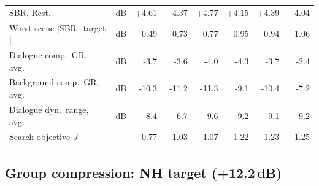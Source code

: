 \documentclass[11pt]{article}
\begin{document}
\begin{table}[H]
\begin{tabular}{@{}l l rrrrrr@{}}
SBR, Rest. & dB & +4.61 & +4.37 & +4.77 & +4.15 & +4.39 & +4.04 \\
Worst-scene $|$SBR$-$target$|$ & dB & 0.49 & 0.73 & 0.77 & 0.95 & 0.94 & 1.06 \\
Dialogue comp.\ GR, avg.\ & dB & -3.7 & -3.6 & -4.0 & -4.3 & -3.7 & -2.4 \\
Background comp.\ GR, avg.\ & dB & -10.3 & -11.2 & -11.3 & -9.1 & -10.4 & -7.2 \\
Dialogue dyn.\ range, avg.\ & dB & 8.4 & 6.7 & 9.6 & 9.2 & 9.1 & 9.2 \\
Search objective $J$ & & 0.77 & 1.03 & 1.07 & 1.22 & 1.23 & 1.25 \\
\bottomrule
\end{tabular}
\end{table}

\subsection*{Group compression: NH target (+12.2\,dB)}
\end{document}

